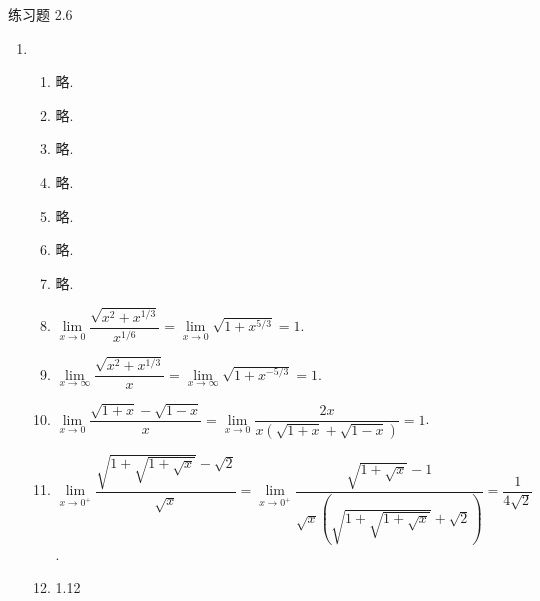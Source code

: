 \documentclass[12pt]{ctexart}
\begin{document}
\pagestyle{empty}

\begin{center}
    {\heiti 练习题 2.6}
\end{center}

\begin{enumerate}
    \item %
        \begin{enumerate}[(1)]
            \item %
                略.
            \item %
                略.
            \item %
                略.
            \item %
                略.
            \item %
                略.
            \item %
                略.
            \item %
                略.
            \item %
                $\lim\limits_{x\to0}\dfrac{\sqrt{x^2 + x^{1/3}}}{x^{1/6}} = \lim\limits_{x\to0}\sqrt{1 + x^{5/3}} = 1$.
            \item %
                $\lim\limits_{x\to\infty}\dfrac{\sqrt{x^2 + x^{1/3}}}{x} = \lim\limits_{x\to\infty}\sqrt{1 + x^{-5/3}} = 1$.
            \item %
                $\lim\limits_{x\to0}\dfrac{\sqrt{1+x} - \sqrt{1-x}}{x} = \lim\limits_{x\to0} \dfrac{2x}{x(\sqrt{1+x} + \sqrt{1-x})} = 1$.
            \item %
                $\lim\limits_{x\to0^+}\dfrac{\sqrt{1+\sqrt{1+\sqrt{x}}} - \sqrt{2}}{\sqrt{x}} = \lim\limits_{x\to0^+} \dfrac{\sqrt{1 + \sqrt{x}} - 1}{\sqrt{x}\left(\sqrt{1+\sqrt{1+\sqrt{x}}} + \sqrt{2}\right)} = \dfrac{1}{4\sqrt{2}}$.
            \item 1.12


\end{enumerate}
\end{enumerate}
\end{document}
